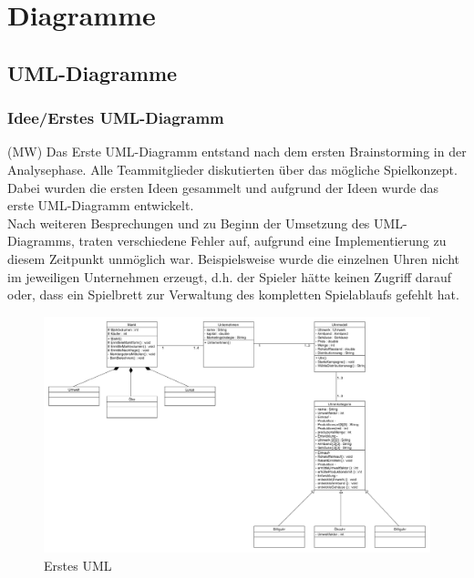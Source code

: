 \clearpage
\chapter{Diagramme}
\section{UML-Diagramme}
\subsection{Idee/Erstes UML-Diagramm}
(MW) Das Erste UML-Diagramm entstand nach dem ersten Brainstorming in der Analysephase. Alle Teammitglieder diskutierten über das mögliche Spielkonzept. Dabei wurden die ersten Ideen gesammelt und aufgrund der Ideen wurde das erste UML-Diagramm entwickelt. \\
Nach weiteren Besprechungen und zu Beginn der Umsetzung des UML-Diagramms, traten verschiedene Fehler auf, aufgrund eine Implementierung zu diesem Zeitpunkt unmöglich war. 
Beispielsweise wurde die einzelnen Uhren nicht im jeweiligen Unternehmen erzeugt, d.h. der Spieler hätte keinen Zugriff darauf oder, dass ein Spielbrett zur Verwaltung des kompletten Spielablaufs gefehlt hat.

\begin{figure} [h]
	\centering
	\includegraphics[scale=0.35, angle=90]{img/ErsterEntwurfUML.png} 
	\caption{Erstes UML} \label{fig:abb26}
\end{figure}

\clearpage
